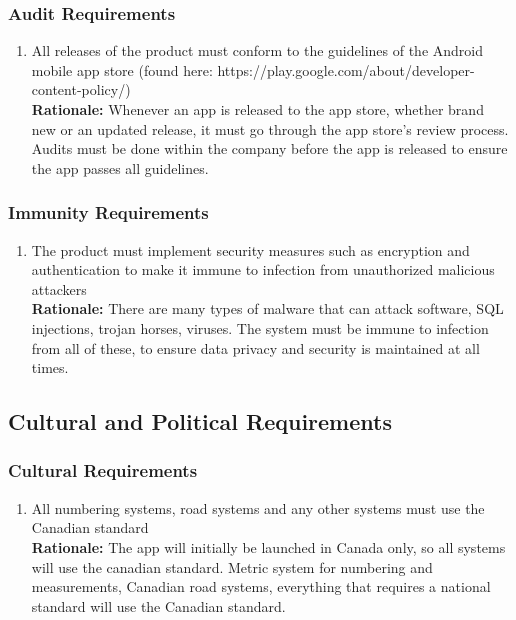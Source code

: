 \documentclass[]{article}
\begin{document}
\subsubsection{Audit Requirements}
\label{ssub:audit_requirements}
\begin{enumerate}[{SR-AU}1. ]
	\item All releases of the product must conform to the guidelines of the Android mobile app store (found here: https://play.google.com/about/developer-content-policy/) \\
	{\bf Rationale:} Whenever an app is released to the app store, whether brand new or an updated release, it must go through the app store's review process. Audits must be done within the company before the app is released to ensure the app passes all guidelines.
\end{enumerate}

\subsubsection{Immunity Requirements}
\label{ssub:immunity_requirements}
\begin{enumerate}[{SR-IM}1. ]
	\item The product must implement security measures such as encryption and authentication to make it immune to infection from unauthorized malicious attackers \\
	{\bf Rationale:} There are many types of malware that can attack software, SQL injections, trojan horses, viruses. The system must be immune to infection from all of these, to ensure data privacy and security is maintained at all times.
\end{enumerate}


\subsection{Cultural and Political Requirements}
\label{sub:cultural_and_political_requirements}

\subsubsection{Cultural Requirements}
\label{ssub:cultural_requirements}
\begin{enumerate}[{CP-C}1. ]
	\item All numbering systems, road systems and any other systems must use the Canadian standard \\
	{\bf Rationale:} The app will initially be launched in Canada only, so all systems will use the canadian standard. Metric system for numbering and measurements, Canadian road systems, everything that requires a national standard will use the Canadian standard.
\end{enumerate}
\end{document}

